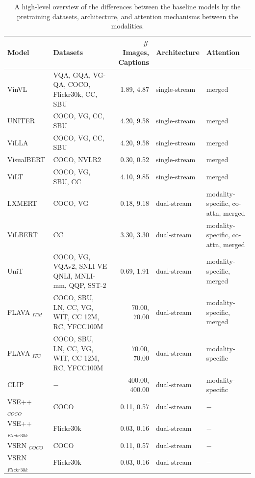 \begin{table}[ht]
    \centering
    \small
    \begin{adjustbox}{max width=\textwidth}
    \begin{tabular}{l|lr|l|l}
    \toprule
    Model & Datasets & \# Images, Captions & Architecture & Attention \\\midrule
    VinVL \cite{zhang2021vinvl}  & VQA, GQA, VG-QA, COCO, Flickr30k, CC, SBU & 1.89, 4.87 & single-stream & merged \\
    UNITER \cite{chen2020uniter}  & COCO, VG, CC, SBU & 4.20, 9.58 & single-stream  &  merged \\
    ViLLA \cite{gan2020villa} & COCO, VG, CC, SBU  & 4.20, 9.58 & single-stream  &  merged \\
    VisualBERT \cite{li2019visualbert}& COCO, NVLR2 & 0.30, 0.52  & single-stream  & merged \\
    ViLT \cite{kim2021vilt}  & COCO, VG, SBU, CC & 4.10, 9.85 & single-stream  & merged \\
    LXMERT \cite{tan2020lxmert}  & COCO, VG & 0.18, 9.18 & dual-stream & modality-specific, co-attn, merged \\
    ViLBERT \cite{lu2019vilbert}  & CC & 3.30, 3.30 & dual-stream  & modality-specific, co-attn, merged \\
    UniT \cite{hu2021unit} & COCO, VG, VQAv2, SNLI-VE QNLI, MNLI-mm, QQP, SST-2 & 0.69, 1.91 & dual-stream & modality-specific, merged\\
    FLAVA $_{ITM}$ \cite{singh2022flava}  & COCO, SBU, LN, CC, VG, WIT, CC 12M, RC, YFCC100M & 70.00, 70.00 & dual-stream & modality-specific, merged \\
    FLAVA $_{ITC}$ \cite{singh2022flava}  & COCO, SBU, LN, CC, VG, WIT, CC 12M, RC, YFCC100M & 70.00, 70.00 & dual-stream & modality-specific \\
    CLIP \cite{radford2021clip}  & $-$ & 400.00, 400.00 & dual-stream & modality-specific \\
    VSE++ $_{COCO}$ \cite{faghri2018vse} & COCO & 0.11, 0.57 & dual-stream & $-$\\
    VSE++ $_{Flickr30k}$ \cite{faghri2018vse} & Flickr30k & 0.03, 0.16 & dual-stream & $-$\\
    VSRN $_{COCO}$ \cite{li2019vsrn}  & COCO & 0.11, 0.57 & dual-stream & $-$\\
    VSRN $_{Flickr30k}$ \cite{li2019vsrn} & Flickr30k & 0.03, 0.16 & dual-stream & $-$\\
    \bottomrule
    \end{tabular}
    \end{adjustbox}
    \caption{A high-level overview of the differences between the baseline models by the pretraining datasets, architecture, and attention mechanisms between the modalities.}
    \label{tab:model-types-baseline}
\end{table}

